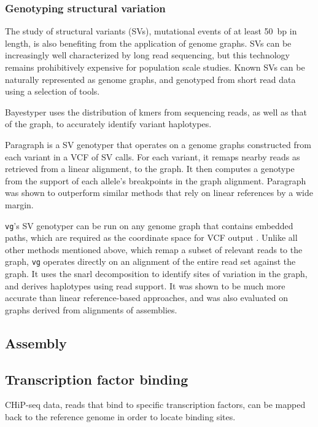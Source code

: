 \subsubsection{Genotyping structural variation}

The study of structural variants (SVs), mutational events of at least 50~bp in length, is also benefiting from the application of genome graphs.
SVs can be increasingly well characterized by long read sequencing, but this technology remains prohibitively expensive for population scale studies.
Known SVs can be naturally represented as genome graphs, and genotyped from short read data using a selection of tools.

Bayestyper \cite{sibbesen2018accurate} uses the distribution of kmers from sequencing reads, as well as that of the graph, to accurately identify variant haplotypes.
 

Paragraph \cite{chen2019paragraph} is a SV genotyper that operates on a genome graphs constructed from each variant in a VCF of SV calls.
For each variant, it remaps nearby reads as retrieved from a linear alignment, to the graph.
It then computes a genotype from the support of each allele's breakpoints in the graph alignment.
Paragraph was shown to outperform similar methods that rely on linear references by a wide margin.

\texttt{vg}'s SV genotyper can be run on any genome graph that contains embedded paths, which are required as the coordinate space for VCF output \cite{hickey2019genotyping}.
Unlike all other methods mentioned above, which remap a subset of relevant reads to the graph, \texttt{vg} operates directly on an alignment of the entire read set against the graph.
It uses the snarl decomposition \cite{paten2018superbubbles} to identify sites of variation in the graph, and derives haplotypes using read support.
It was shown to be much more accurate than linear reference-based approaches, and was also evaluated on graphs derived from alignments of assemblies.

\subsection{Assembly}

\subsection{Transcription factor binding}

CHiP-seq data, reads that bind to specific transcription factors, can be mapped back to the reference genome in order to locate binding sites.
 
